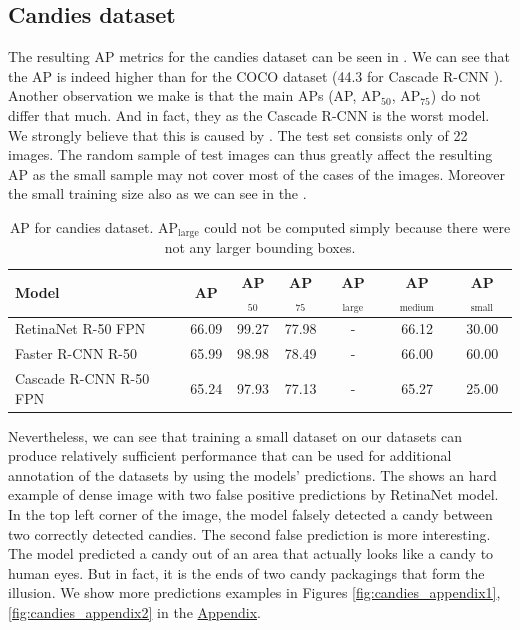 \subsection*{Candies dataset}
The resulting AP metrics for the candies dataset can be seen in
. We can see that the AP is indeed higher than for the COCO
dataset (44.3 for Cascade R-CNN \cite{detectron}). Another observation we make
is that the main APs (AP, AP$_{50}$, AP$_{75}$) do not differ that much. And
in fact, they  as the Cascade R-CNN is
the worst model. We strongly believe that this is caused by . The test set consists only of 22 images. The random sample of
test images can thus greatly affect the resulting AP as the small sample may not
cover most of the cases of the images. Moreover the small training size also
 as we can see in the .

\begin{table}[H]
	\centering
	\begin{tabular}{l|c|c|c|c|c|c}
		Model                  & AP    & AP$_{50}$ & AP$_{75}$ & AP$_\text{large}$ & AP$_\text{medium}$ & AP$_\text{small}$ \\
		\hline
		RetinaNet R-50 FPN     & 66.09 & 99.27     & 77.98     & -                 & 66.12              & 30.00             \\
		Faster R-CNN R-50      & 65.99 & 98.98     & 78.49     & -                 & 66.00              & 60.00             \\
		Cascade R-CNN R-50 FPN & 65.24 & 97.93     & 77.13     & -                 & 65.27              & 25.00
	\end{tabular}
	\caption{AP for candies dataset. AP$_\text{large}$ could not be computed
		simply because there were not any larger bounding boxes.}
	\label{tab:candies}
\end{table}

Nevertheless, we can see that training a small dataset on our datasets can
produce relatively sufficient performance that can be used for additional
annotation of the datasets by using the models' predictions. The
 shows an hard example of dense image with two false
positive predictions by RetinaNet model. In the top left corner of the image,
the model falsely detected a candy between two correctly detected candies. The
second false prediction is more interesting. The model predicted a candy out of
an area that actually looks like a candy to human eyes. But in fact, it is
the ends of two candy packagings that form the illusion. We show more
predictions examples in Figures \ref{fig:candies_appendix1},
\ref{fig:candies_appendix2} in the \hyperref[appendix]{Appendix}.

